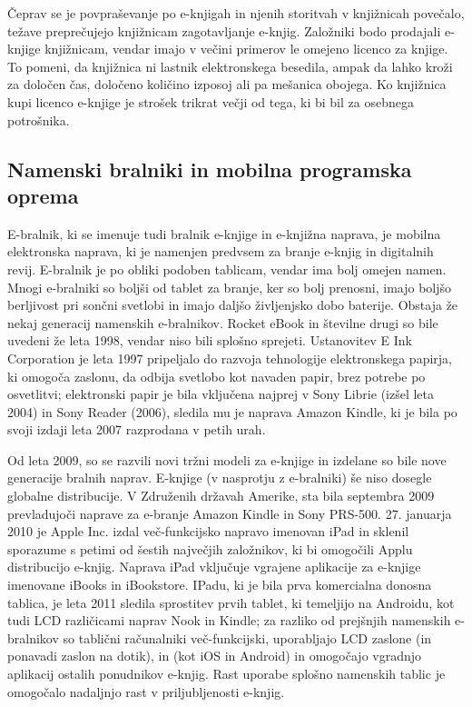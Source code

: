 \documentclass[a4paper, 12pt]{book}
\begin{document}
Čeprav se je povpraševanje po e-knjigah in njenih storitvah v knjižnicah povečalo, težave preprečujejo knjižnicam zagotavljanje e-knjig. \cite{22} Založniki bodo prodajali e-knjige knjižnicam, vendar imajo v večini primerov le omejeno licenco za knjige. To pomeni, da knjižnica ni lastnik elektronskega besedila, ampak da lahko kroži za določen čas, določeno količino izposoj ali pa mešanica obojega. Ko knjižnica kupi licenco e-knjige je strošek trikrat večji od tega, ki bi bil za osebnega potrošnika. \cite{22}

\subsection{Namenski bralniki in mobilna programska oprema}
\label{eknjiga_namenskiBralniki}
E-bralnik, ki se imenuje tudi bralnik e-knjige in e-knjižna naprava, je mobilna elektronska naprava, ki je namenjen predvsem za branje e-knjig in digitalnih revij. E-bralnik je po obliki podoben tablicam, vendar ima bolj omejen namen. Mnogi e-bralniki so boljši od tablet za branje, ker so bolj prenosni, imajo boljšo berljivost pri sončni svetlobi in imajo daljšo življenjsko dobo baterije. \cite{23}
Obstaja že nekaj generacij namenskih e-bralnikov. Rocket eBook \cite{24} in številne drugi so bile uvedeni že leta 1998, vendar niso bili splošno sprejeti. Ustanovitev E Ink Corporation je leta 1997 pripeljalo do razvoja tehnologije elektronskega papirja, ki omogoča zaslonu, da odbija svetlobo kot navaden papir, brez potrebe po osvetlitvi; elektronski papir je bila vključena najprej v Sony Librie (izšel leta 2004) in Sony Reader (2006), sledila mu je naprava Amazon Kindle, ki je bila po svoji izdaji leta 2007 razprodana v petih urah. 

Od leta 2009, so se razvili novi tržni modeli za e-knjige in izdelane so bile nove generacije bralnih naprav. E-knjige (v nasprotju z e-bralniki) še niso dosegle globalne distribucije. V Združenih državah Amerike, sta bila septembra 2009 prevladujoči naprave za e-branje Amazon Kindle in Sony PRS-500. \cite{25}
27. januarja 2010 je Apple Inc. izdal več-funkcijsko napravo imenovan iPad \cite{26} in sklenil sporazume s petimi od šestih največjih založnikov, ki bi omogočili Applu distribucijo e-knjig. \cite{27} Naprava iPad vključuje vgrajene aplikacije za e-knjige imenovane iBooks in iBookstore. IPadu, ki je bila prva komercialna donosna tablica, je leta 2011 sledila sprostitev prvih tablet, ki temeljijo na Androidu, kot tudi LCD različicami naprav Nook in Kindle; za razliko od prejšnjih namenskih e-bralnikov so tablični računalniki več-funkcijski, uporabljajo LCD zaslone (in ponavadi zaslon na dotik), in (kot iOS in Android) in omogočajo vgradnjo aplikacij ostalih ponudnikov e-knjig. Rast uporabe splošno namenskih tablic je omogočalo nadaljnjo rast v priljubljenosti e-knjig.
\end{document}
